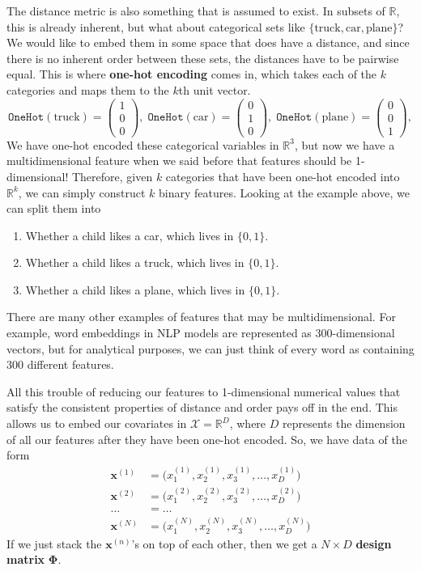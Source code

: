 \documentclass{article}
\theoremstyle{definition}
\theoremstyle{remark}
\theoremstyle{definition}
\begin{document}
The distance metric is also something that is assumed to exist. In subsets of $\mathbb{R}$, this is already inherent, but what about categorical sets like $\{\text{truck}, \text{car}, \text{plane}\}$? We would like to embed them in some space that does have a distance, and since there is no inherent order between these sets, the distances have to be pairwise equal. This is where \textbf{one-hot encoding} comes in, which takes each of the $k$ categories and maps them to the $k$th unit vector. 
\[\texttt{OneHot}(\text{truck}) = \begin{pmatrix} 1 \\ 0 \\ 0 \end{pmatrix}, \; \texttt{OneHot}(\text{car}) = \begin{pmatrix} 0 \\ 1 \\ 0 \end{pmatrix}, \; \texttt{OneHot}(\text{plane}) = \begin{pmatrix} 0 \\ 0 \\ 1 \end{pmatrix}, \]
We have one-hot encoded these categorical variables in $\mathbb{R}^3$, but now we have a multidimensional feature when we said before that features should be 1-dimensional! Therefore, given $k$ categories that have been one-hot encoded into $\mathbb{R}^k$, we can simply construct $k$ binary features. Looking at the example above, we can split them into 
\begin{enumerate}
    \item Whether a child likes a car, which lives in $\{0, 1\}$. 
    \item Whether a child likes a truck, which lives in $\{0, 1\}$. 
    \item Whether a child likes a plane, which lives in $\{0, 1\}$. 
\end{enumerate}
There are many other examples of features that may be multidimensional. For example, word embeddings in NLP models are represented as 300-dimensional vectors, but for analytical purposes, we can just think of every word as containing 300 different features. 

All this trouble of reducing our features to 1-dimensional numerical values that satisfy the consistent properties of distance and order pays off in the end. This allows us to embed our covariates in $\mathcal{X} = \mathbb{R}^D$, where $D$ represents the dimension of all our features after they have been one-hot encoded. So, we have data of the form
\begin{align*} 
\mathbf{x}^{(1)} & = \big(x^{(1)}_1, x^{(1)}_2, x^{(1)}_3, \ldots, x^{(1)}_D \big) \\
\mathbf{x}^{(2)} & = \big(x^{(2)}_1, x^{(2)}_2, x^{(2)}_3, \ldots, x^{(2)}_D \big) \\
\ldots & = \ldots \\
\mathbf{x}^{(N)} & = \big(x^{(N)}_1, x^{(N)}_2, x^{(N)}_3, \ldots, x^{(N)}_D \big) 
\end{align*}
If we just stack the $\mathbf{x}^{(n)}$'s on top of each other, then we get a $N \times D$ \textbf{design matrix} $\boldsymbol{\Phi}$. 
\end{document}
